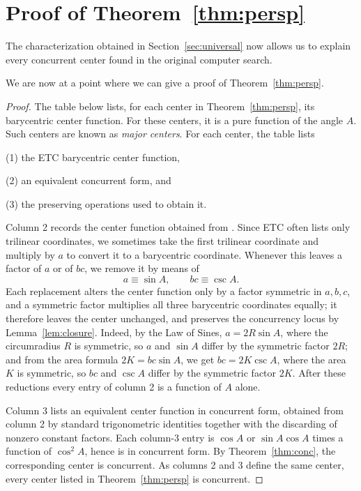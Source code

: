 \documentclass[12pt,a4paper]{amsart}
\theoremstyle{remark}
\begin{document}
\section{Proof of Theorem~\ref{thm:persp}}\label{sec:proof}

The characterization obtained in Section~\ref{sec:universal} now allows us to explain every
concurrent center found in the original computer search.

We are now at a point where we can give a proof of Theorem~\ref{thm:persp}.

\begin{proof}
The table below lists, for each center in Theorem~\ref{thm:persp}, its barycentric center function.
For these centers, it is a pure function of the angle $A$. Such centers are known as \emph{major centers}.
For each center, the table lists

(1) the ETC barycentric center function,

(2) an equivalent concurrent form, and

(3) the preserving operations used to obtain it.

Column 2 records the center function obtained from \cite{ETC}. Since ETC often lists
only trilinear coordinates, we sometimes take the first trilinear coordinate and
multiply by $a$ to convert it to a barycentric coordinate. Whenever this leaves a
factor of $a$ or of $bc$, we remove it by means of
\[
   a\equiv\sin A,\qquad bc\equiv\csc A.
\]
Each replacement alters the center function only by a factor symmetric in $a,b,c$,
and a symmetric factor multiplies all three barycentric coordinates equally; it
therefore leaves the center unchanged, and preserves the concurrency locus by
Lemma~\ref{lem:closure}. Indeed, by the Law of Sines, $a=2R\sin A$, where the
circumradius $R$ is symmetric, so $a$ and $\sin A$ differ by the symmetric factor
$2R$; and from the area formula $2K=bc\sin A$, we get $bc=2K\csc A$, where the area
$K$ is symmetric, so $bc$ and $\csc A$ differ by the symmetric factor $2K$. After
these reductions every entry of column 2 is a function of $A$ alone.

Column 3 lists an equivalent center function in concurrent form, obtained from
column 2 by standard trigonometric identities
together with the discarding of nonzero constant factors. Each column-3 entry is
$\cos A$ or $\sin A\cos A$ times a function of $\cos^2A$, hence is in concurrent form.
By Theorem~\ref{thm:conc}, the corresponding center is concurrent. As columns
2 and 3 define the same center, every center listed in Theorem~\ref{thm:persp} is
concurrent.
\end{proof}
\end{document}
